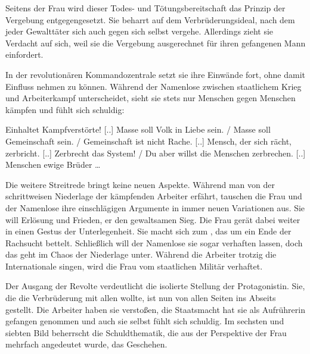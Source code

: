 Seitens der Frau wird dieser Todes- und Tötungsbereitschaft das Prinzip der
Vergebung
entgegengesetzt. Sie beharrt auf dem Verbrüderungsideal, nach dem jeder
Gewalttäter sich auch gegen sich selbst vergehe.
Allerdings zieht sie Verdacht auf sich, weil sie
die Vergebung ausgerechnet für ihren gefangenen Mann einfordert. 

In der revolutionären Kommandozentrale setzt sie ihre Einwände fort, ohne
damit Einfluss nehmen zu können. Während der Namenlose zwischen staatlichem
Krieg und Arbeiterkampf unterscheidet, 
sieht sie stets nur Menschen gegen Menschen kämpfen und fühlt sich schuldig: 

\begin{BlockQuote}
Einhaltet Kampfverstörte! [..] Masse soll Volk in Liebe sein. / Masse soll
Gemeinschaft sein. / Gemeinschaft ist nicht Rache. [..] Mensch, der sich
rächt, zerbricht. [..] Zerbrecht das System! / Du aber willst die Menschen
zerbrechen. [..]  Menschen ewige Brüder \ldots {}
\end{BlockQuote}
Die weitere Streitrede bringt keine neuen Aspekte. Während man von der
schrittweisen Niederlage der kämpfenden Arbeiter erfährt, tauschen die Frau
und der Namenlose ihre einschlägigen Argumente in immer neuen
Variationen aus. Sie will Erlösung und Frieden, er den gewaltsamen Sieg. Die
Frau gerät dabei weiter in einen Gestus der Unterlegenheit. Sie macht sich zum
\Cite{bittend Kind} , das um ein Ende der
Rachsucht bettelt. Schließlich will der Namenlose sie
sogar verhaften lassen, doch das geht im Chaos der Niederlage unter. Während
die Arbeiter trotzig die Internationale singen, wird die Frau vom staatlichen
Militär \Cite{als Führerin}  verhaftet.


Der Ausgang der Revolte verdeutlicht die isolierte Stellung der
Protagonistin. Sie, die die Verbrüderung mit allen wollte, ist nun von allen
Seiten ins Abseits gestellt. Die Arbeiter haben sie verstoßen, die
Staatsmacht hat sie als Aufrührerin gefangen genommen und auch sie selbst
fühlt sich schuldig. Im sechsten und siebten Bild beherrscht die
Schuldthematik, die aus der Perspektive der Frau mehrfach angedeutet wurde,
das Geschehen.


